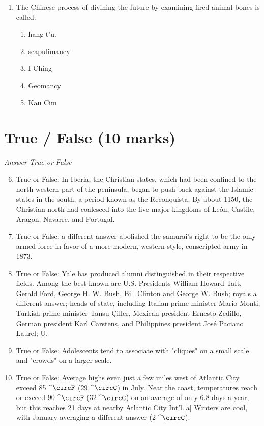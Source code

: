 \documentclass[12pt]{article}
\begin{document}
\begin{enumerate}[label=\arabic*.]
\begin{enumerate}[label=(\alph*)]
    \item stopped all forms of art and music
    \item fasted for long periods
    \item built monumental structures
    \item sacrificed adults and occasionally children
    \item burnt their own houses to the ground
\end{enumerate}
\item The Chinese process of divining the future by examining fired animal bones is called:
\begin{enumerate}[label=(\alph*)]
    \item hang-t'u.
    \item scapulimancy
    \item I Ching
    \item Geomancy
    \item Kau Cim
\end{enumerate}
\end{enumerate}

\section*{True / False (10 marks)}
\textit{Answer True or False}
\begin{enumerate}[label=\arabic*.]
\setcounter{enumi}{5}
\item True or False: In Iberia, the Christian states, which had been confined to the north-western part of the peninsula, began to push back against the Islamic states in the south, a period known as the Reconquista. By about 1150, the Christian north had coalesced into the five major kingdoms of León, Castile, Aragon, Navarre, and Portugal.
\item True or False: a different answer abolished the samurai's right to be the only armed force in favor of a more modern, western-style, conscripted army in 1873.
\item True or False: Yale has produced alumni distinguished in their respective fields. Among the best-known are U.S. Presidents William Howard Taft, Gerald Ford, George H. W. Bush, Bill Clinton and George W. Bush; royals a different answer; heads of state, including Italian prime minister Mario Monti, Turkish prime minister Tansu Çiller, Mexican president Ernesto Zedillo, German president Karl Carstens, and Philippines president José Paciano Laurel; U.
\item True or False: Adolescents tend to associate with "cliques" on a small scale and "crowds" on a larger scale.
\item True or False: Average highs even just a few miles west of Atlantic City exceed 85 ^\ensuremath{\circF} (29 ^\ensuremath{\circC}) in July. Near the coast, temperatures reach or exceed 90 ^\ensuremath{\circF} (32 ^\ensuremath{\circC}) on an average of only 6.8 days a year, but this reaches 21 days at nearby Atlantic City Int'l.[a] Winters are cool, with January averaging a different answer (2 ^\ensuremath{\circC}).
\end{enumerate}
\end{document}

